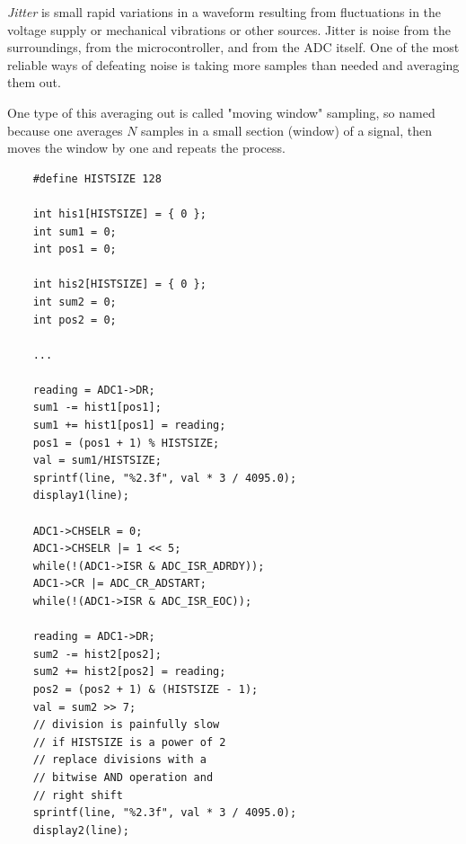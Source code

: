 \emph{Jitter} is small rapid variations in a waveform resulting from
fluctuations in the voltage supply or mechanical vibrations or other
sources. Jitter is noise from the surroundings, from the microcontroller,
and from the ADC itself. One of the most reliable ways of defeating noise
is taking more samples than needed and averaging them out.

One type of this averaging out is called "moving window" sampling, so named
because one averages $N$ samples in a small section (window) of a signal,
then moves the window by one and repeats the process.

\begin{lstlisting}
    #define HISTSIZE 128

    int his1[HISTSIZE] = { 0 };
    int sum1 = 0;
    int pos1 = 0;
    
    int his2[HISTSIZE] = { 0 };
    int sum2 = 0;
    int pos2 = 0;

    ... 

    reading = ADC1->DR;
    sum1 -= hist1[pos1];
    sum1 += hist1[pos1] = reading;
    pos1 = (pos1 + 1) % HISTSIZE;
    val = sum1/HISTSIZE;
    sprintf(line, "%2.3f", val * 3 / 4095.0);
    display1(line);

    ADC1->CHSELR = 0;
    ADC1->CHSELR |= 1 << 5;
    while(!(ADC1->ISR & ADC_ISR_ADRDY));
    ADC1->CR |= ADC_CR_ADSTART;
    while(!(ADC1->ISR & ADC_ISR_EOC));

    reading = ADC1->DR;
    sum2 -= hist2[pos2];
    sum2 += hist2[pos2] = reading;
    pos2 = (pos2 + 1) & (HISTSIZE - 1);
    val = sum2 >> 7;
    // division is painfully slow
    // if HISTSIZE is a power of 2
    // replace divisions with a 
    // bitwise AND operation and 
    // right shift
    sprintf(line, "%2.3f", val * 3 / 4095.0);
    display2(line);
\end{lstlisting}